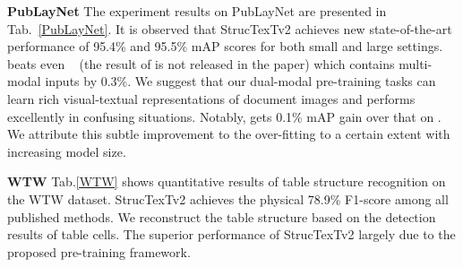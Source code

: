 \documentclass{article} \usepackage{iclr2023_conference,times}
\begin{document}
\noindent\textbf{PubLayNet} The experiment results on PubLayNet are presented in Tab.~\ref{PubLayNet}. 
It is observed that StrucTexTv2 achieves new state-of-the-art performance of 95.4\% and 95.5\% mAP scores for both small and large settings.  beats even ~\cite{huang2022layoutlmv3} (the result of  is not released in the paper) which contains multi-modal inputs by 0.3\%. We suggest that our dual-modal pre-training tasks can learn rich visual-textual representations of document images and performs excellently in confusing situations. Notably, 
gets 0.1\% mAP gain over that on . We attribute this subtle improvement to the over-fitting to a certain extent with increasing model size.

\noindent\textbf{WTW} Tab.\ref{WTW} shows quantitative results of table structure recognition on the WTW dataset. StrucTexTv2 achieves the physical 78.9\% F1-score among all published methods. We reconstruct the table structure based on the detection results of table cells. The superior performance of StrucTexTv2 largely due to the proposed pre-training framework.
\end{document}
